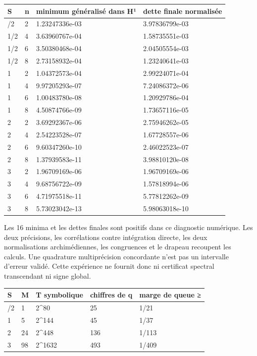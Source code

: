 \documentclass[
  10pt,
  a4paper,
]{article}
\begin{document}
\begin{longtable}[]{@{}llll@{}}
\toprule\noalign{}
S & n & minimum généralisé dans H¹ & dette finale normalisée \\
\midrule\noalign{}
\endhead
\bottomrule\noalign{}
\endlastfoot
1/2 & 2 & 1.23247336e-03 & 3.97836799e-03 \\
1/2 & 4 & 3.63960767e-04 & 1.58735551e-03 \\
1/2 & 6 & 3.50380468e-04 & 2.04505554e-03 \\
1/2 & 8 & 2.73158932e-04 & 1.23240641e-03 \\
1 & 2 & 1.04372573e-04 & 2.99224071e-04 \\
1 & 4 & 9.97205293e-07 & 7.24086372e-06 \\
1 & 6 & 1.00483780e-08 & 1.20929786e-04 \\
1 & 8 & 4.50874766e-09 & 1.73657116e-05 \\
2 & 2 & 3.69292367e-06 & 2.75946262e-05 \\
2 & 4 & 2.54223528e-07 & 1.67728557e-06 \\
2 & 6 & 9.60347260e-10 & 2.46022523e-07 \\
2 & 8 & 1.37939583e-11 & 3.98810120e-08 \\
3 & 2 & 1.96709169e-06 & 1.96709169e-06 \\
3 & 4 & 9.68756722e-09 & 1.57818994e-06 \\
3 & 6 & 4.71975518e-11 & 5.77812262e-09 \\
3 & 8 & 5.73023042e-13 & 5.98063018e-10 \\
\end{longtable}

Les 16 minima et les dettes finales sont positifs dans ce diagnostic
numérique. Les deux précisions, les corrélations contre intégration
directe, les deux normalisations archimédiennes, les congruences et le
drapeau recoupent les calculs. Une quadrature multiprécision concordante
n'est pas un intervalle d'erreur validé. Cette expérience ne fournit
donc ni certificat spectral transcendant ni signe global.

\begin{longtable}[]{@{}lllll@{}}
\toprule\noalign{}
S & M & T symbolique & chiffres de q & marge de queue ≥ \\
\midrule\noalign{}
\endhead
\bottomrule\noalign{}
\endlastfoot
1/2 & 1 & 2\^{}80 & 25 & 1/21 \\
1 & 5 & 2\^{}144 & 45 & 1/37 \\
2 & 24 & 2\^{}448 & 136 & 1/113 \\
3 & 98 & 2\^{}1632 & 493 & 1/409 \\
\end{longtable}
\end{document}
